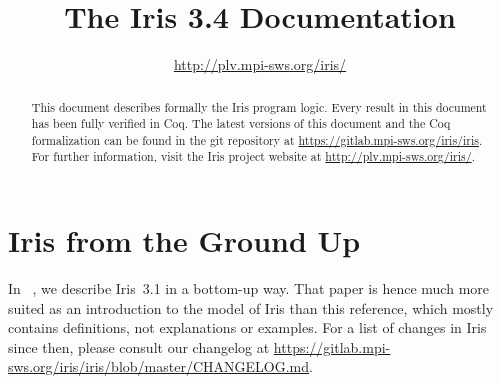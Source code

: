\documentclass[10pt]{article}
\title{\bfseries The Iris 3.4 Documentation}
\author{\url{http://plv.mpi-sws.org/iris/}}
\begin{document}
\maketitle
\thispagestyle{empty}
\vfill
\begin{abstract}
This document describes formally the Iris program logic.
Every result in this document has been fully verified in Coq.
The latest versions of this document and the Coq formalization can be found in the git repository at \url{https://gitlab.mpi-sws.org/iris/iris}.
For further information, visit the Iris project website at \url{http://plv.mpi-sws.org/iris/}.
\end{abstract}

\clearpage\begingroup
\tableofcontents
\endgroup

\clearpage\begingroup
\section{Iris from the Ground Up}
In ~\cite{iris-ground-up}, we describe Iris~3.1 in a bottom-up way.
That paper is hence much more suited as an introduction to the model of Iris than this reference, which mostly contains definitions, not explanations or examples.
For a list of changes in Iris since then, please consult our changelog at \url{https://gitlab.mpi-sws.org/iris/iris/blob/master/CHANGELOG.md}.
\endgroup

\clearpage\begingroup

\endgroup
\clearpage\begingroup

\endgroup
\clearpage\begingroup

\endgroup
\clearpage\begingroup

\endgroup
\clearpage\begingroup

\endgroup
\clearpage\begingroup

\endgroup
\clearpage\begingroup

\endgroup
\clearpage\begingroup

\endgroup
\clearpage\begingroup

\endgroup
\clearpage\begingroup
\printbibliography
\endgroup
\end{document}
